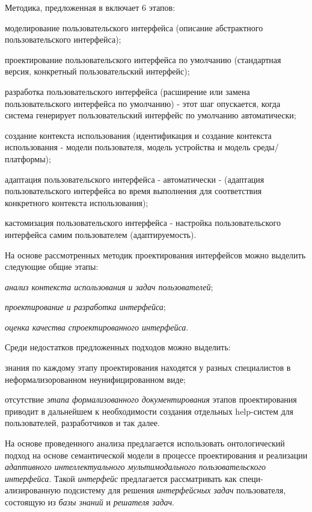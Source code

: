 Методика, предложенная в  включает 6 этапов:
\begin{textitemize}
	\item моделирование пользовательского интерфейса (описание абстрактного пользовательского интерфейса);
	\item проектирование пользовательского интерфейса по умолчанию (стандартная версия, конкретный пользовательский интерфейс);
	\item разработка пользовательского интерфейса (расширение или замена пользовательского интерфейса по умолчанию) - этот шаг опускается, когда система генерирует пользовательский интерфейс по умолчанию автоматически;
	\item создание контекста использования (идентификация и создание контекста использования - модели пользователя, модель устройства и модель среды/платформы);
	\item адаптация пользовательского интерфейса - автоматически - (адаптация пользовательского интерфейса во время выполнения для соответствия конкретного контекста использования);
	\item кастомизация пользовательского интерфейса - настройка пользовательского интерфейса самим пользователем (адаптируемость).
\end{textitemize}

На основе рассмотренных методик проектирования интерфейсов можно выделить следующие общие этапы:
\begin{textitemize}
\item \textit{анализ контекста использования и задач пользователей};
\item \textit{проектирование и разработка интерфейса};
\item \textit{оценка качества спроектированного интерфейса}.
\end{textitemize}

Среди недостатков предложенных подходов можно выделить:
\begin{textitemize}
	\item знания по каждому этапу проектирования находятся у разных специалистов в неформализорованном неунифицированном виде;
	\item отсутствие \textit{этапа формализованного документирования} этапов проектирования приводит в дальнейшем к необходимости создания отдельных help-систем для пользователей, разработчиков и так далее.
\end{textitemize}

На основе проведенного анализа предлагается использовать онтологический подход на основе семантической модели в процессе проектирования и реализации \textit{адаптивного интеллектуального мультимодального пользовательского интерфейса}. Такой \textit{интерфейс} предлагается рассматривать как специ-
ализированную подсистему для решения \textit{интерфейсных задач} пользователя, состоящую из \textit{базы знаний} и \textit{решателя задач}. 


